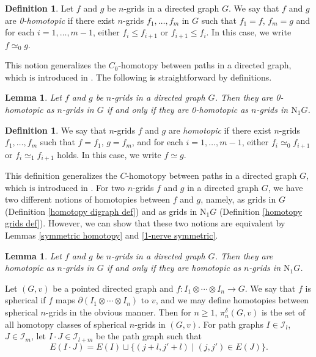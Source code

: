 \documentclass[oneside, 12pt]{amsart}
\numberwithin{equation}{section}
\theoremstyle{plain}
\newtheorem{lemma}[theorem]{Lemma}
\theoremstyle{definition}
\newtheorem{definition}[theorem]{Definition}
\theoremstyle{remark}
\begin{document}
	\begin{definition}
		Let $f$ and $g$ be $n$-grids in a directed graph $G$. We say that $f$ and $g$ are \emph{0-homotopic} if there exist $n$-grids $f_1,\ldots,f_m$ in $G$ such that $f_1=f$, $f_m=g$ and for each $i=1,\ldots,m-1$, either $f_i\le f_{i+1}$ or $f_{i+1}\le f_i$. In this case, we write $f\simeq_0g$.
	\end{definition}
	This notion generalizes the $C_0$-homotopy between paths in a directed graph, which is introduced in \cite{KT}. The following is straightforward by definitions.
	\begin{lemma}
		\label{two C_0-homotopies}
		Let $f$ and $g$ be $n$-grids in a directed graph $G$. Then they are 0-homotopic as $n$-grids in $G$ if and only if they are 0-homotopic as $n$-grids in $\mathrm{N}_1G$.
	\end{lemma}
	\begin{definition}
		We say that $n$-grids $f$ and $g$ are \emph{homotopic} if there exist $n$-grids $f_1,\ldots,f_m$ such that $f=f_1$, $g=f_m$, and for each $i=1,\ldots,m-1$, either $f_i\simeq_0f_{i+1}$ or $f_i\simeq_1 f_{i+1}$ holds. In this case, we write $f\simeq g$.
	\end{definition}
	This definition generalizes the $C$-homotopy between paths in a directed graph $G$, which is introduced in \cite{GLMY2}. For two $n$-grids $f$ and $g$ in a directed graph $G$, we have two different notions of homotopies between $f$ and $g$, namely, as grids in $G$ (Definition \ref{homotopy digraph def}) and as grids in $\mathrm{N}_1G$ (Definition \ref{homotopy grids def}). However, we can show that these two notions are equivalent by Lemmas \ref{symmetric homotopy} and \ref{1-nerve symmetric}. 
	\begin{lemma}
		\label{two homotopies}
		Let $f$ and $g$ be $n$-grids in a directed graph $G$. Then they are homotopic as $n$-grids in $G$ if and only if they are homotopic as $n$-grids in $\mathrm{N}_1G$.
	\end{lemma}
	Let $(G,v)$ be a pointed directed graph and $f\colon I_1\otimes\cdots\otimes I_n\to G$. We say that $f$ is spherical if $f$ maps $\partial(I_1\otimes\cdots\otimes I_n)$ to $v$, and we may define homotopies between spherical $n$-grids in the obvious manner. Then for $n\ge 1$, $\pi^\delta_n(G,v)$ is the set of all homotopy classes of spherical $n$-grids in $(G,v)$. For path graphs $I\in\mathcal{I}_{l}$, $J\in\mathcal{I}_m$, let $I\cdot J\in\mathcal{I}_{l+m}$ be the path graph such that
	\[
	E(I\cdot J)=E(I)\sqcup\{(j+l,j'+l)\mid (j,j')\in E(J)\}.
	\]
\end{document}
